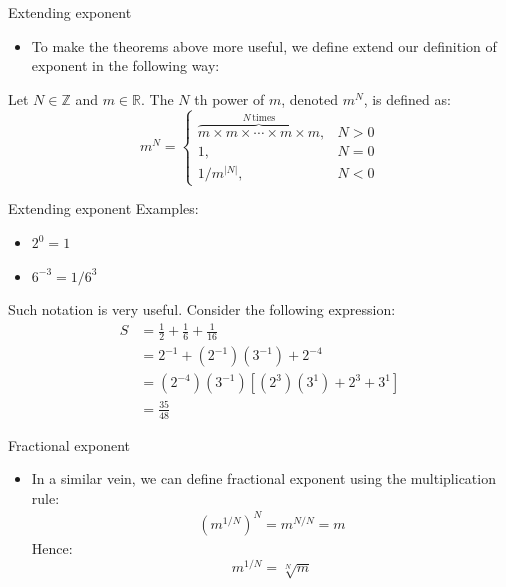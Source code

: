 \documentclass[10pt,xcolor={table,dvipsnames},t]{beamer}
\begin{document}
\begin{frame}{Extending exponent}
  \begin{itemize}
    \item To make the theorems above more useful, we define extend our definition of exponent in the following way:
  \end{itemize}
  \begin{definition}
    Let $N\in \mathbb{Z}$ and $m\in \mathbb{R}$. The $N$ th power of $m$, denoted $m^N$, is defined as:
    \begin{equation}
      m^N = \begin{cases}
        \overbrace{m \times m \times \cdots \times m \times m}^{N\,\text{times}},& N > 0 \\
        1, & N = 0\\
        1/m^{|N|},&N <0

      \end{cases}
    \end{equation}
  \end{definition}
\end{frame}

\begin{frame}{Extending exponent}
  Examples:
  \begin{itemize}
    \item $2^0 = 1$
    \item $6^{-3} = 1/6^3$
  \end{itemize}
  Such notation is very useful. Consider the following expression:
  \begin{align*}
    S &= \frac{1}{2} + \frac{1}{6} + \frac{1}{16}\\
    &= 2^{-1} + \left(2^{-1}\right)\left(3^{-1}\right) + 2^{-4}\\
    &= \left(2^{-4}\right)\left(3^{-1}\right) \left[ \left(2^3\right)\left(3^1\right) + 2^3 + 3^1\right]\\
    &= \frac{35}{48}
  \end{align*}
\end{frame}

\begin{frame}{Fractional exponent}
  \begin{itemize}
    \item In a similar vein, we can define fractional exponent using the multiplication rule:
    \begin{align*}
      \left(m^{1/N}\right)^N = m^{N/N} = m
    \end{align*}
    Hence:
    \begin{equation*}
      m^{1/N} = \sqrt[N]{m}
    \end{equation*}
  \end{itemize}
\end{frame}
\end{document}
